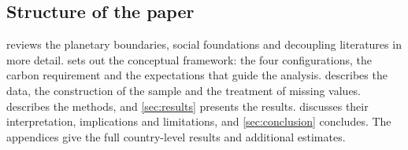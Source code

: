 \subsection*{Structure of the paper}

 reviews the planetary boundaries, social foundations and decoupling literatures in more detail.  sets out the conceptual framework: the four configurations, the carbon requirement and the expectations that guide the analysis.  describes the data, the construction of the sample and the treatment of missing values.  describes the methods, and \cref{sec:results} presents the results.  discusses their interpretation, implications and limitations, and \cref{sec:conclusion} concludes. The appendices give the full country-level results and additional estimates.
